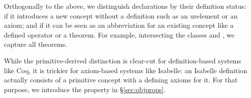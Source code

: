 %
%

Orthogonally to the above, we distinguish declarations by their definition status:  if it introduces a new concept without a definition such as an urelement or an axiom; and  if it can be seen as an abbreviation for an existing concept like a defined operator or a theorem.
For example, intersecting the classes \truthObject and , we capture all theorems.

While the primitive-derived distinction is clear-cut for definition-based systems like Coq, it is trickier for axiom-based systems like Isabelle: an Isabelle definition actually consists of a primitive concept with a defining axioms for it.
For that purpose, we introduce the  property in \S\ref{sec:objprops}.
  
